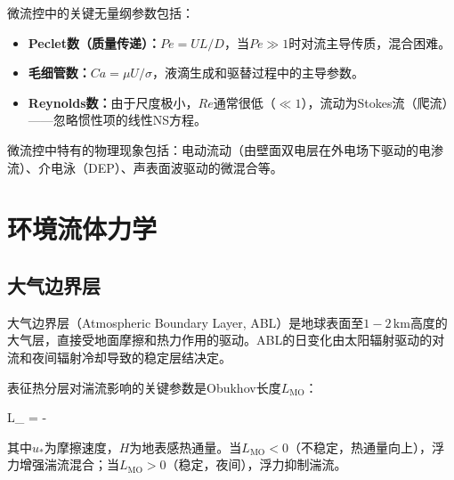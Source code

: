 微流控中的关键无量纲参数包括：
\begin{itemize}
  \item \textbf{Peclet数（质量传递）：}$Pe = UL/D$，当$Pe\gg 1$时对流主导传质，混合困难。
  \item \textbf{毛细管数：}$Ca = \mu U/\sigma$，液滴生成和驱替过程中的主导参数。
  \item \textbf{Reynolds数：}由于尺度极小，$Re$通常很低（$\ll 1$），流动为Stokes流（爬流）——忽略惯性项的线性NS方程。
\end{itemize}

微流控中特有的物理现象包括：电动流动（由壁面双电层在外电场下驱动的电渗流）、介电泳（DEP）、声表面波驱动的微混合等。

\section{环境流体力学}

\subsection{大气边界层}

大气边界层（Atmospheric Boundary Layer, ABL）是地球表面至$1-2\,\text{km}$高度的大气层，直接受地面摩擦和热力作用的驱动。ABL的日变化由太阳辐射驱动的对流和夜间辐射冷却导致的稳定层结决定。

表征热分层对湍流影响的关键参数是Obukhov长度$L_{\text{MO}}$：

\begin{myformula}
L_{} = -
\end{myformula}

其中$u_{*}$为摩擦速度，$H$为地表感热通量。当$L_{\text{MO}}<0$（不稳定，热通量向上），浮力增强湍流混合；当$L_{\text{MO}}>0$（稳定，夜间），浮力抑制湍流。

